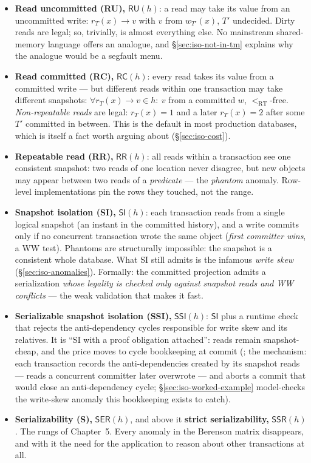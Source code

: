 \begin{itemize}
\item \textbf{Read uncommitted (RU),} $\mathsf{RU}(h)$: a read may take its
value from an uncommitted write:
$r_T(x)\!\to\!v$ with $v$ from $w_{T'}(x)$, $T'$ undecided. Dirty reads are legal; so, trivially, is almost everything
else. No mainstream shared-memory language offers an analogue, and
\S\ref{sec:iso-not-in-tm} explains why the analogue would be a segfault menu.

\item \textbf{Read committed (RC),} $\mathsf{RC}(h)$: every read takes its
value from a committed write --- but different reads within one transaction
may take different snapshots: $\forall r_T(x)\!\to\!v\in h:\ v$ from a
committed $w$, $<_\mathrm{RT}$-free. \emph{Non-repeatable reads} are legal: $r_T(x){=}1$ and
a later $r_T(x){=}2$ after some $T'$ committed in between. This is the default
in most production databases, which is itself a fact worth arguing about
(\S\ref{sec:iso-cost}).

\item \textbf{Repeatable read (RR),} $\mathsf{RR}(h)$: all reads within a
transaction see one consistent snapshot: two reads of one location never
disagree, but new objects may appear
between two reads of a \emph{predicate} --- the \emph{phantom} anomaly.
Row-level implementations pin the rows they touched, not the range.

\item \textbf{Snapshot isolation (SI),} $\mathsf{SI}(h)$: each transaction
reads from a single
logical snapshot (an instant in the committed history), and a write commits
only if no concurrent transaction wrote the same object (\emph{first
committer wins}, a WW test). Phantoms are structurally impossible: the
snapshot is a consistent whole database. What SI still admits is the
infamous \emph{write skew} (\S\ref{sec:iso-anomalies}). Formally: the
committed projection admits a serialization \emph{whose legality is checked
only against snapshot reads and WW conflicts} --- the weak validation that
makes it fast.

\item \textbf{Serializable snapshot isolation (SSI),} $\mathsf{SSI}(h)$:
$\mathsf{SI}$ plus a runtime check
that rejects the anti-dependency cycles responsible for write skew and its
relatives. It is ``SI with a proof obligation attached'': reads remain
snapshot-cheap, and the price moves to cycle bookkeeping at commit
(\cite{kleppmann17}; the mechanism: each transaction records the anti-dependencies created by
its snapshot reads --- reads a concurrent committer later overwrote --- and
aborts a commit that would close an anti-dependency cycle;
\S\ref{sec:iso-worked-example} model-checks the write-skew anomaly this
bookkeeping exists to catch).

\item \textbf{Serializability (S),} $\mathsf{SER}(h)$, and above it
\textbf{strict serializability,} $\mathsf{SSR}(h)$. The rungs of
Chapter~5. Every anomaly in the Berenson
matrix disappears, and with it the need for the application to reason about
other transactions at all.
\end{itemize}

